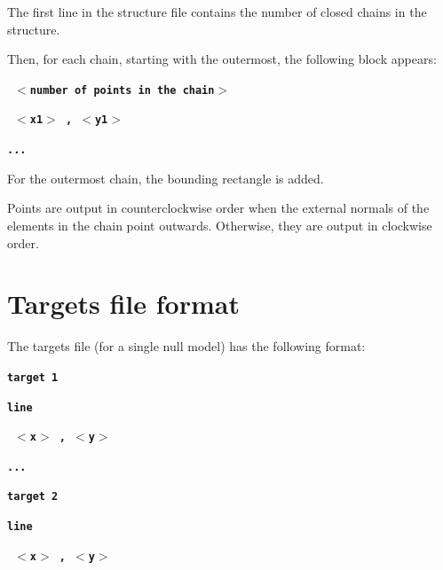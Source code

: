 \documentclass[12pt]{report}
\begin{document}
The first line in the structure file contains the number of closed
chains in the structure.

Then, for each chain, starting with the outermost, the following block
appears:

\textbf{\texttt{ \begin{math}<\end{math}number of points in the
chain\begin{math}>\end{math} }}

\textbf{\texttt{ \begin{math}<\end{math}x1\begin{math}>\end{math}  ,
 \begin{math}<\end{math}y1\begin{math}>\end{math} }}

\textbf{\texttt{...}}

For the outermost chain, the bounding rectangle is added.

Points are output in counterclockwise order when the external normals
of the elements in the chain point outwards. Otherwise, they are output
in clockwise order.

\section{Targets file format}

The targets file (for a single null model) has the following format:

\textbf{\texttt{target 1}}

\textbf{\texttt{line}}

\textbf{\texttt{ \begin{math}<\end{math}x\begin{math}>\end{math} ,
 \begin{math}<\end{math}y\begin{math}>\end{math}}}

\textbf{\texttt{...}}

\textbf{\texttt{target 2}}

\textbf{\texttt{line}}

\textbf{\texttt{ \begin{math}<\end{math}x\begin{math}>\end{math} ,
 \begin{math}<\end{math}y\begin{math}>\end{math}}}
\end{document}
